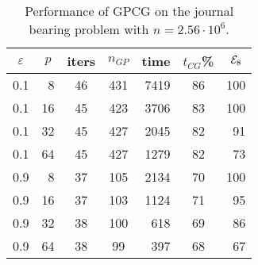 \begin{table}[htbp]
\caption{Performance of GPCG on the journal bearing problem
with $ n = 2.56 \cdot 10^6 $.}
\label{flops-2560K}
\begin{center}
\footnotesize
\begin{tabular}{| c r | c c r c r |}
\hline
\multicolumn{1}{|c}{$ \varepsilon $} & 
\multicolumn{1}{c|}{$ p $} & 
\multicolumn{1}{c}{iters} &
\multicolumn{1}{c}{$n_{GP}$} & 
\multicolumn{1}{c}{time} &
\multicolumn{1}{c}{$t_{CG}$\%} & 
\multicolumn{1}{c|}{$ {\cal E}_8 $} \\ \hline
0.1  & 8 & 46 & 431 & 7419 & 86 & 100  \\ 
0.1  & 16 & 45 & 423 & 3706 & 83 & 100  \\
0.1  & 32 & 45 & 427 & 2045 & 82 & 91 \\
0.1  & 64 & 45 & 427 & 1279 & 82 & 73 \\
\hline
0.9  & 8 & 37 & 105 & 2134 & 70 & 100 \\
0.9  & 16 & 37 & 103 & 1124 & 71 & 95 \\
0.9  & 32 & 38 & 100 & 618 & 69 & 86 \\
0.9  & 64 & 38 & 99 & 397 & 68 & 67 \\
\hline
\end{tabular}
\end{center}
\end{table}

